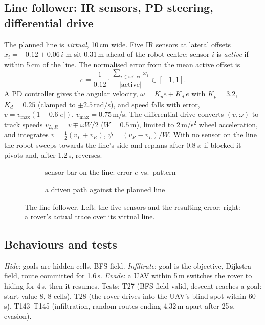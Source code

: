 \subsection{Line follower: IR sensors, PD steering, differential drive}
The planned line is \emph{virtual}, 10\,cm wide. Five IR sensors at lateral offsets $x_i=-0.12+0.06\,i$ m sit 0.31\,m ahead of the robot centre; sensor $i$ is \emph{active} if within 5\,cm of the line. The normalised error from the mean active offset is
\begin{equation}e=\frac{1}{0.12}\cdot\frac{\sum_{i\in\text{active}}x_i}{|\text{active}|}\in[-1,1].\end{equation}
A PD controller gives the angular velocity, $\omega=K_pe+K_d\,\dot e$ with $K_p=3.2$, $K_d=0.25$ (clamped to $\pm2.5$\,rad/s), and speed falls with error, $v=v_\text{max}(1-0.6|e|)$, $v_\text{max}=0.75$\,m/s. The differential drive converts $(v,\omega)$ to track speeds
$v_{L,R}=v\mp\omega W/2$ ($W=0.5$\,m), limited to 2\,m/s$^2$ wheel acceleration, and integrates $v=\tfrac12(v_L+v_R)$, $\dot\psi=(v_R-v_L)/W$. With no sensor on the line the robot sweeps towards the line's side and replans after 0.8\,s; if blocked it pivots and, after 1.2\,s, reverses.
\lstFollowLine
\begin{figure}[h]
\centering
\begin{subfigure}{0.49\linewidth}\caption{sensor bar on the line: error $e$ vs.\ pattern}\end{subfigure}
\begin{subfigure}{0.49\linewidth}\caption{a driven path against the planned line}\end{subfigure}
\caption{The line follower. Left: the five sensors and the resulting error; right: a rover's actual trace over its virtual line.}
\end{figure}

\subsection{Behaviours and tests}
\emph{Hide}: goals are hidden cells, BFS field. \emph{Infiltrate}: goal is the objective, Dijkstra field, route committed for 1.6\,s. \emph{Evade}: a UAV within 5\,m switches the rover to hiding for 4\,s, then it resumes. Tests: T27 (BFS field valid, descent reaches a goal: start value 8, 8 cells), T28 (the rover drives into the UAV's blind spot within 60\,s), T143--T145 (infiltration, random routes ending 4.32\,m apart after 25\,s, evasion).
